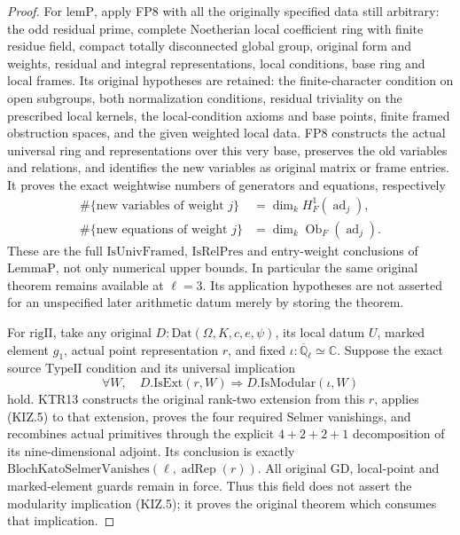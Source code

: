\begin{proof}
For \(\mathrm{lemP}\), apply FP8 with all the originally
specified data still arbitrary: the odd residual prime, complete
Noetherian local coefficient ring with finite residue field,
compact totally disconnected global group, original form and
weights, residual and integral representations, local conditions,
base ring and local frames.  Its original hypotheses are retained:
the finite-character condition on open subgroups, both normalization
conditions, residual triviality on the prescribed local kernels,
the local-condition axioms and base points, finite framed
obstruction spaces, and the given weighted local data.
FP8 constructs the actual universal ring and representations over
this very base, preserves the old variables and relations, and
identifies the new variables as original matrix or frame entries.
It proves the exact weightwise numbers of generators and equations,
respectively
\[
 \begin{aligned}
 \#\{\text{new variables of weight }j\}
      &=\dim_k H^1_F(\operatorname{ad}_j),\\
 \#\{\text{new equations of weight }j\}
      &=\dim_k\operatorname{Ob}_F(\operatorname{ad}_j).
 \end{aligned}
 \tag{KIZ.4}
\]
These are the full \(\mathrm{IsUnivFramed}\),
\(\mathrm{IsRelPres}\) and entry-weight conclusions of
\(\mathrm{LemmaP}\), not only numerical upper bounds.
In particular the same original theorem remains available at
\(\ell=3\).  Its application hypotheses are not asserted for
an unspecified later arithmetic datum merely by storing the theorem.

For \(\mathrm{rigII}\), take any original
\(D:\mathrm{Dat}(\Omega,K,c,e,\psi)\), its local datum
\(U\), marked element \(g_1\), actual point representation
\(r\), and fixed \(\iota:\overline{\mathbb Q}_\ell\simeq
\mathbb C\).  Suppose the exact source \(\mathrm{TypeII}\)
condition and its universal implication
\[
 \forall W,\quad D.\mathrm{IsExt}(r,W)
                  \Longrightarrow D.\mathrm{IsModular}(\iota,W)
 \tag{KIZ.5}
\]
hold.  KTR13 constructs the original rank-two extension from this
\(r\), applies (KIZ.5) to that extension, proves the four required
Selmer vanishings, and recombines actual primitives through the
explicit \(4+2+2+1\) decomposition of its nine-dimensional
adjoint.  Its conclusion is exactly
\(\mathrm{BlochKatoSelmerVanishes}(\ell,\operatorname{adRep}(r))\).
All original \(\mathrm{GD}\), local-point and marked-element
guards remain in force.  Thus this field does not assert the
modularity implication (KIZ.5); it proves the original theorem
which consumes that implication.


\end{proof}
